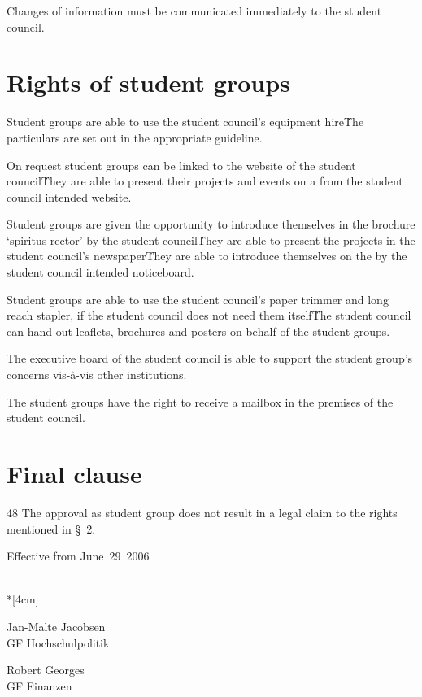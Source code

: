 \begin{multicols}{2}
\Abs \Satz Changes of information must be communicated immediately to the student council.

\section{Rights of student groups} 
\Abs \Satz Student groups are able to use the student council’s equipment hire\. The particulars are set out in the appropriate guideline.

\Abs \Satz On request student groups can be linked to the website of the student council\. They are 
able to present their projects and events on a from the student council intended website. 

\Abs \Satz Student groups are given the opportunity to introduce themselves in the brochure ‘spiritus rector’ by the student council\. They are able to present the projects in the student council’s newspaper\. They are able to introduce themselves on the by the student council intended noticeboard.

\Abs \Satz Student groups are able to use the student council’s paper trimmer and long reach stapler, if the student council does not need them itself\. The student council can hand out leaflets, brochures and posters on behalf of the student groups. 

\Abs \Satz The executive board of the student council is able to support the student group’s concerns vis-à-vis other institutions. 

\Abs \Satz The student groups have the right to receive a mailbox in the premises of the student council. 

\section{Final clause} 
48 \Abs \Satz The approval as student group does not result in a legal claim to the rights mentioned in §~2. 

\end{multicols} 


\vspace{1cm} 

Effective from June~29~2006


\normalsize
~\\*[4cm]
\begin{center}
\hspace*{\fill}
\parbox{7cm}{Jan-Malte Jacobsen\\GF Hochschulpolitik}
\hfill\parbox{7cm}{Robert Georges\\GF Finanzen}\hspace*{\fill}
\end{center}